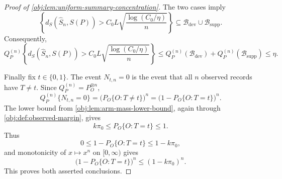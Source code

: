 \begin{proof}[Proof of \cref{obj:lem:uniform-summary-concentration}]
The two cases imply
\[
\left\{
d_S(\widehat S_n,S(P))>
C_0L\sqrt{\frac{\log(C_0/\eta)}{n}}
\right\}
\subseteq
\mathcal B_{\mathrm{dev}}\cup\mathcal B_{\mathrm{supp}}.
\]
Consequently,
\[
Q_P^{(n)}
\left\{
d_S(\widehat S_n,S(P))>
C_0L\sqrt{\frac{\log(C_0/\eta)}{n}}
\right\}
\le
Q_P^{(n)}(\mathcal B_{\mathrm{dev}})
+
Q_P^{(n)}(\mathcal B_{\mathrm{supp}})
\le
\eta .
\]  %

Finally fix \(t\in\{0,1\}\).  The event \(N_{t,n}=0\) is the event that all
\(n\) observed records have \(T\ne t\).  Since
\(Q_P^{(n)}=P_O^{\otimes n}\),
\[
Q_P^{(n)}\{N_{t,n}=0\}
=
\bigl(P_O\{O:T\ne t\}\bigr)^n
=
\bigl(1-P_O\{O:T=t\}\bigr)^n .
\]
The lower bound from \cref{obj:lem:arm-mass-lower-bound}, again through
\cref{obj:def:observed-margin}, gives
\[
k\pi_0\le P_O\{O:T=t\}\le 1.
\]
Thus
\[
0\le 1-P_O\{O:T=t\}\le 1-k\pi_0,
\]
and monotonicity of \(x\mapsto x^n\) on \([0,\infty)\) gives
\[
\bigl(1-P_O\{O:T=t\}\bigr)^n
\le
(1-k\pi_0)^n .
\]
This proves both asserted conclusions.  %
\end{proof}
